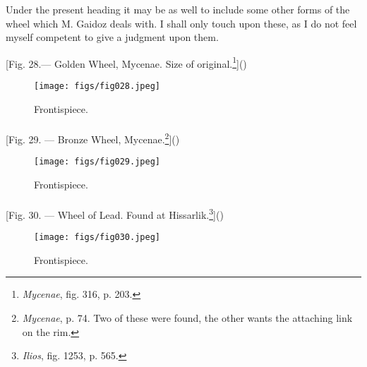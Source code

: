 \documentclass[a4paper, 11pt, oneside, polutonikogreek, english]{article}
\begin{document}
Under the present heading it may be as well to include some other forms of the wheel which M. Gaidoz deals with. I shall only touch upon these, as I do not feel myself competent to give a judgment upon them.

[Fig. 28.--- Golden Wheel, Mycenae. Size of original.\footnote{\emph{Mycenae}, fig. 316, p. 203.}]()
\begin{figure}[H]
\centering
\texttt{[image: figs/fig028.jpeg]}
\caption{Frontispiece.}
\end{figure}
\paragraph{}
[Fig. 29. --- Bronze Wheel, Mycenae.\footnote{\emph{Mycenae}, p. 74. Two of these were found, the other wants the attaching link on the rim.}]()
\begin{figure}[H]
\centering
\texttt{[image: figs/fig029.jpeg]}
\caption{Frontispiece.}
\end{figure}
\paragraph{}
[Fig. 30. --- Wheel of Lead. Found at Hissarlik.\footnote{\emph{Ilios}, fig. 1253, p. 565.}]()
\begin{figure}[H]
\centering
\texttt{[image: figs/fig030.jpeg]}
\caption{Frontispiece.}
\end{figure}
\end{document}
